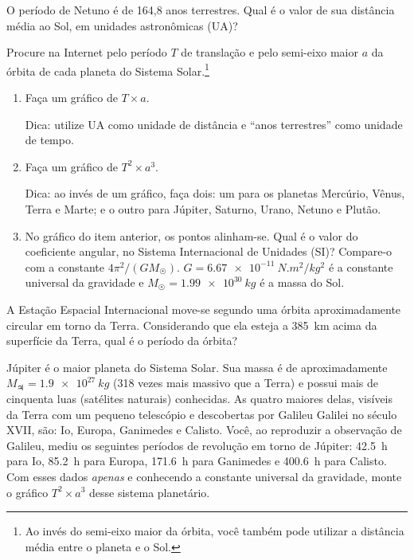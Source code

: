 \documentclass[a4paper]{article}
\begin{document}
\begin{exercicio}
 O período de Netuno é de 164,8 anos terrestres. Qual é o valor de sua distância média ao Sol, em unidades astronômicas (UA)?
\end{exercicio}

\begin{exercicio}
 Procure na Internet pelo período $T$ de translação e pelo semi-eixo maior $a$ da órbita de cada planeta do Sistema Solar.\footnote{Ao invés do semi-eixo maior da órbita, você também pode utilizar a distância média entre o planeta e o Sol.}
\begin{enumerate}
\item Faça um gráfico de $T \times a$.

{\footnotesize Dica: utilize UA como unidade de distância e ``anos terrestres'' como unidade de tempo.}

\item Faça um gráfico de $T^2 \times a^3$.

{\footnotesize Dica: ao invés de um gráfico, faça dois: um para os planetas Mercúrio, Vênus, Terra e Marte;
e o outro para Júpiter, Saturno, Urano, Netuno e Plutão.}

\item No gráfico do item anterior, os pontos alinham-se. Qual é o valor do coeficiente angular, no Sistema Internacional de Unidades (SI)?
Compare-o com a constante $4\pi^2/(GM_{\astrosun})$. $G = \SI{6.67e-11}{N.m^2/kg^2}$ é a constante universal da gravidade e $M_{\astrosun} = \SI{1.99e30}{kg}$ é a massa do Sol.
\end{enumerate}
\end{exercicio}

\begin{exercicio}
 A Estação Espacial Internacional move-se segundo uma órbita aproximadamente circular em torno da Terra.
Considerando que ela esteja a \SI{385}{km} acima da superfície da Terra, qual é o período da órbita?
\end{exercicio}

\begin{exercicio*}
 Júpiter é o maior planeta do Sistema Solar. Sua massa é de aproximadamente $M_{\jupiter}=\SI{1.9e27}{kg}$ (318 vezes mais massivo que a Terra) e possui mais de cinquenta luas (satélites naturais) conhecidas. As quatro maiores delas, visíveis da Terra com um pequeno telescópio e descobertas por Galileu Galilei no século XVII, são: Io, Europa, Ganimedes e Calisto. Você, ao reproduzir a observação de Galileu, mediu os seguintes períodos de revolução em torno de Júpiter: \SI{42.5}{h} para Io, \SI{85.2}{h} para Europa, \SI{171.6}{h} para Ganimedes e \SI{400.6}{h} para Calisto.  
Com esses dados \emph{apenas} e conhecendo a constante universal da gravidade, monte o gráfico $T^2 \times a^3$ desse sistema planetário.
\end{exercicio*}
\end{document}
